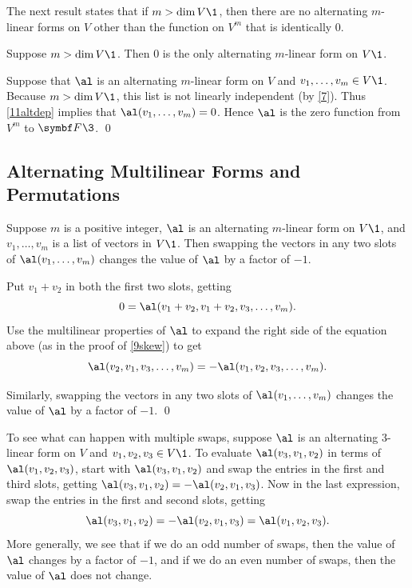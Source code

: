 \addvspace{14bp}

The next result states that if $m > \dim V\1$, then there are no alternating $m$-linear forms on $V$ other than the function on $V^m$ that is identically $0$.

{Suppose $m > \dim V\1$. Then $0$ is the only alternating $m$-linear form on $V\1$.}

\proof
Suppose that $\al$ is an alternating $m$-linear form on $V$ and $v_1, \ldots, v_m \in V\1$. Because $m > \dim V\1$, this list is not linearly independent (by \ref{7}). Thus \ref{11altdep} implies that $\al(v_1, \ldots, v_m) = 0$. Hence $\al$ is the zero function from $V^m$ to $\F{}\3$.
\qed

\subsection{Alternating Multilinear Forms and Permutations}

{Suppose $m$ is a positive integer, $\al$ is an alternating $m$-linear form on $V\1$, and $v_1, \ldots, v_m$ is a list of vectors in $V\1$. Then swapping the vectors in any two slots of $\al(v_1, \ldots, v_m)$ changes the value of $\al$ by a factor of $-1$.}

\proof
Put $v_1 + v_2$ in both the first two slots, getting
\[
0 = \al(v_1 + v_2, v_1 + v_2, v_3, \ldots, v_m).
\]
Use the multilinear properties of $\al$ to expand the right side of the equation above (as in the proof of \ref{9skew}) to get
\[
\al(v_2, v_1, v_3, \ldots, v_m) = -\al(v_1, v_2, v_3, \ldots, v_m).
\]

Similarly, swapping the vectors in any two slots of $\al(v_1, \ldots, v_m)$ changes the value of $\al$ by a factor of $-1$.
\qed

To see what can happen with multiple swaps, suppose $\al$ is an alternating $3$-linear form on $V$ and
$v_1, v_2, v_3 \in V\1$. To evaluate $\al(v_3, v_1, v_2)$ in terms of $\al(v_1, v_2, v_3)$, start with
$\al(v_3, v_1, v_2)$ and swap the entries in the first and third slots, getting $\al(v_3, v_1, v_2) = -\al(v_2, v_1, v_3)$. Now in the last expression, swap the entries in the first and second slots, getting
\[
\al(v_3, v_1, v_2) = -\al(v_2, v_1, v_3) = \al(v_1, v_2, v_3).
\]
More generally, we see that if we do an odd number of swaps, then the value of $\al$ changes by a factor of $-1$, and if we do an even number of swaps, then the value of $\al$ does not change.

